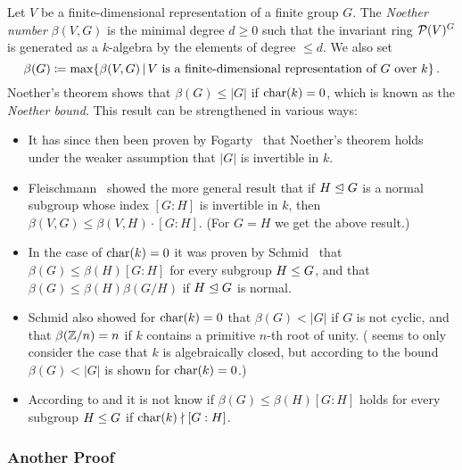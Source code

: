 \begin{remark}
  \label{remark: Noether bound}
  Let $V$ be a finite-dimensional representation of a finite group $G$.
  The \emph{Noether number} $\beta(V,G)$ is the minimal degree $d \geq 0$ such that the invariant ring $\mathcal{P}(V)^G$ is generated as a $k$-algebra by the elements of degree $\leq d$.
  We also set
  \[
              \beta(G)
    \defined  \max  \{
                      \beta(V,G)
                    \suchthat
                      \text{$V$ is a finite-dimensional representation of $G$ over $k$}
                    \} \,.
  \]
  Noether’s theorem shows that $\beta(G) \leq |G|$ if $\operatorname{char}(k) = 0$, which is known as the \emph{Noether bound}.
  This result can be strengthened in various ways:
  \begin{itemize}
    \item
      It has since then been proven by Fogarty~\cite{Fogarty2001} that Noether’s theorem holds under the weaker assumption that $|G|$ is invertible in $k$.
    \item
      Fleischmann~\cite{Fleischmann2000} showed the more general result that if $H \trianglelefteq G$ is a normal subgroup whose index $[G : H]$ is invertible in $k$, then $\beta(V,G) \leq \beta(V,H) \cdot [G : H]$.
      (For $G = H$ we get the above result.)
    \item
      In the case of $\operatorname{char}(k) = 0$ it was proven by Schmid~\cite{Schmid1991} that $\beta(G) \leq \beta(H)[G : H]$ for every subgroup $H \leq G$, and that $\beta(G) \leq \beta(H)\beta(G/H)$ if $H \trianglelefteq G$ is normal.
    \item
      Schmid also showed for $\operatorname{char}(k) = 0$ that $\beta(G) < |G|$ if $G$ is not cyclic, and that $\beta(\mathbb{Z}/n) = n$ if $k$ contains a primitive $n$-th root of unity.
      (\cite{Schmid1991} seems to only consider the case that $k$ is algebraically closed, but according to \cite[Theorem~3.7]{Wehlau2006} the bound $\beta(G) < |G|$ is shown for $\operatorname{char}(k) = 0$.)
    \item
      According to \cite[Remark 3.6]{Wehlau2006} and \cite[Remark~3.2.5]{Derksen2015} it is not know if $\beta(G) \leq \beta(H)[G : H]$ holds for every subgroup $H \leq G$ if $\operatorname{char}(k) \nmid [G : H]$. 
  \end{itemize}
\end{remark}



\subsubsection*{Another Proof}



